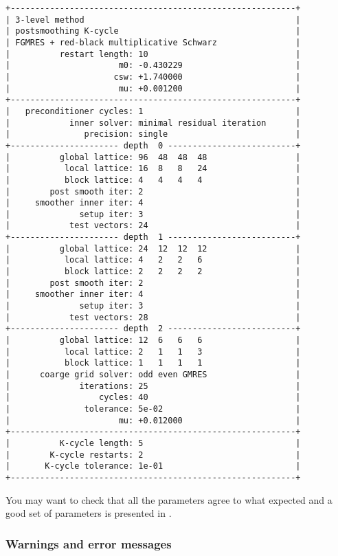 \begin{Verbatim}[fontsize=\small]
+----------------------------------------------------------+
| 3-level method                                           |
| postsmoothing K-cycle                                    |
| FGMRES + red-black multiplicative Schwarz                |
|          restart length: 10                              |
|                      m0: -0.430229                       |
|                     csw: +1.740000                       |
|                      mu: +0.001200                       |
+----------------------------------------------------------+
|   preconditioner cycles: 1                               |
|            inner solver: minimal residual iteration      |
|               precision: single                          |
+---------------------- depth  0 --------------------------+
|          global lattice: 96  48  48  48                  |
|           local lattice: 16  8   8   24                  |
|           block lattice: 4   4   4   4                   |
|        post smooth iter: 2                               |
|     smoother inner iter: 4                               |
|              setup iter: 3                               |
|            test vectors: 24                              |
+---------------------- depth  1 --------------------------+
|          global lattice: 24  12  12  12                  |
|           local lattice: 4   2   2   6                   |
|           block lattice: 2   2   2   2                   |
|        post smooth iter: 2                               |
|     smoother inner iter: 4                               |
|              setup iter: 3                               |
|            test vectors: 28                              |
+---------------------- depth  2 --------------------------+
|          global lattice: 12  6   6   6                   |
|           local lattice: 2   1   1   3                   |
|           block lattice: 1   1   1   1                   |
|      coarge grid solver: odd even GMRES                  |
|              iterations: 25                              |
|                  cycles: 40                              |
|               tolerance: 5e-02                           |
|                      mu: +0.012000                       |
+----------------------------------------------------------+
|          K-cycle length: 5                               |
|        K-cycle restarts: 2                               |
|       K-cycle tolerance: 1e-01                           |
+----------------------------------------------------------+
\end{Verbatim}
You may want to check that all the parameters agree to what expected and a good set of parameters is presented in \cite{Alexandrou:2016}.
\subsubsection{Warnings and error messages}





